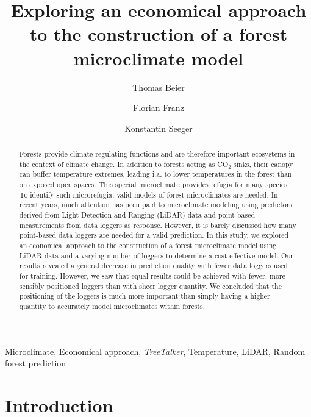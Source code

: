 \documentclass[5p]{elsarticle} %
\begin{document}
\begin{frontmatter}

  \title{Exploring an economical approach to the construction of a forest microclimate model}
    \author[Philipps-University Marburg]{Thomas Beier}
    \author[Philipps-University Marburg]{Florian Franz}
    \author[Philipps-University Marburg]{Konstantin Seeger}
      \address[Philipps-University Marburg]{Philipps-University Marburg,
FB 19 Geography, Deutschhausstraße 10, 35032 Marburg, Germany}
    
  \begin{abstract}
Forests provide climate-regulating functions and are therefore important ecosystems in the context of climate change. In addition to forests acting as CO$_{2}$ sinks, their canopy can buffer temperature extremes, leading i.a. to lower temperatures in the forest than on exposed open spaces. This special microclimate provides refugia for many species. To identify such microrefugia, valid models of forest microclimates are needed. In recent years, much attention has been paid to microclimate modeling using predictors derived from Light Detection and Ranging (LiDAR) data and point-based measurements from data loggers as response. However, it is barely discussed how many point-based data loggers are needed for a valid prediction. In this study, we explored an economical approach to the construction of a forest microclimate model using LiDAR data and a varying number of loggers to determine a cost-effective model. Our results revealed a general decrease in prediction quality with fewer data loggers used for training. However, we saw that equal results could be achieved with fewer, more sensibly positioned loggers than with sheer logger quantity. We concluded that the positioning of the loggers is much more important than simply having a higher quantity to accurately model microclimates within forests.

  \end{abstract}
   \begin{keyword} Microclimate, Economical approach, \emph{TreeTalker}, Temperature, LiDAR, Random forest prediction \end{keyword}
 \end{frontmatter}

\newpage

\hypertarget{introduction}{%
\section{Introduction}\label{introduction}}
\end{document}
